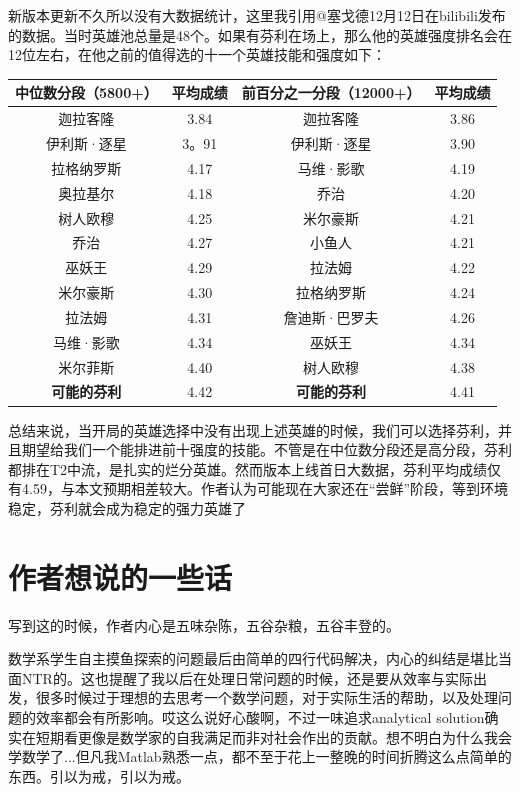\documentclass{ctexart}
\theoremstyle{definition}
\begin{document}
新版本更新不久所以没有大数据统计，这里我引用@塞戈德12月12日在bilibili发布的数据。当时英雄池总量是48个。如果有芬利在场上，那么他的英雄强度排名会在12位左右，在他之前的值得选的十一个英雄技能和强度如下：
\begin{center}
    
\begin{tabular}{||c|c||c|c||}
     \hline
     中位数分段（5800+）& 平均成绩& 前百分之一分段（12000+）&平均成绩  \\
     \hline
    迦拉客隆 & 3.84 & 迦拉客隆 & 3.86\\
         \hline
    伊利斯·逐星 & 3。91 & 伊利斯·逐星 & 3.90\\
         \hline
    拉格纳罗斯 & 4.17 & 马维·影歌 & 4.19\\
         \hline
    奥拉基尔 & 4.18 & 乔治 & 4.20\\
         \hline
    树人欧穆 & 4.25 & 米尔豪斯 & 4.21\\
         \hline
    乔治 & 4.27 & 小鱼人 & 4.21\\
         \hline
    巫妖王 & 4.29 & 拉法姆 & 4.22\\
         \hline
    米尔豪斯 & 4.30 & 拉格纳罗斯 & 4.24\\
         \hline
    拉法姆 & 4.31 & 詹迪斯·巴罗夫 & 4.26\\
         \hline
     马维·影歌 & 4.34 & 巫妖王 & 4.34\\
         \hline
    米尔菲斯 & 4.40 & 树人欧穆 & 4.38\\
         \hline
    {\bfseries 可能的芬利} & 4.42 & {\bfseries 可能的芬利} & 4.41\\
         \hline
\end{tabular}
\end{center}
总结来说，当开局的英雄选择中没有出现上述英雄的时候，我们可以选择芬利，并且期望给我们一个能排进前十强度的技能。不管是在中位数分段还是高分段，芬利都排在T2中流，是扎实的烂分英雄。然而版本上线首日大数据，芬利平均成绩仅有4.59，与本文预期相差较大。作者认为可能现在大家还在“尝鲜”阶段，等到环境稳定，芬利就会成为稳定的强力英雄了
\section*{作者想说的一些话}
写到这的时候，作者内心是五味杂陈，五谷杂粮，五谷丰登的。

数学系学生自主摸鱼探索的问题最后由简单的四行代码解决，内心的纠结是堪比当面NTR的。这也提醒了我以后在处理日常问题的时候，还是要从效率与实际出发，很多时候过于理想的去思考一个数学问题，对于实际生活的帮助，以及处理问题的效率都会有所影响。哎这么说好心酸啊，不过一味追求analytical solution确实在短期看更像是数学家的自我满足而非对社会作出的贡献。想不明白为什么我会学数学了...但凡我Matlab熟悉一点，都不至于花上一整晚的时间折腾这么点简单的东西。引以为戒，引以为戒。
\end{document}

